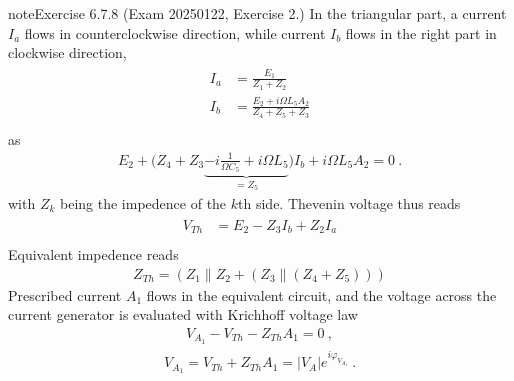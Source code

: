 \documentclass[letterpaper,10pt,english]{jupyterBook}
\begin{document}
\begin{sphinxadmonition}{note}{Exercise 6.7.8 (Exam 2025\sphinxhyphen{}01\sphinxhyphen{}22, Exercise 2.)}
\sphinxAtStartPar
In the triangular part, a current \(I_{a}\) flows in counter\sphinxhyphen{}clockwise direction, while current \(I_b\) flows in the right part in clockwise direction,
\begin{equation*}
\begin{split}\begin{aligned}
  I_a & = \frac{E_1}{Z_1 + Z_2} \\
  I_b & = \frac{E_2 + i \Omega L_5 A_2}{Z_4 + Z_5 + Z_3} \\
\end{aligned}\end{split}
\end{equation*}
\sphinxAtStartPar
as
\begin{equation*}
\begin{split}E_2 + \bigg( Z_4 + Z_3 \underbrace{- i \frac{1}{\Omega C_5} + i \Omega L_5}_{=Z_5} \bigg) I_b + i \Omega L_5 A_2 = 0 \ . \end{split}
\end{equation*}
\sphinxAtStartPar
with \(Z_k\) being the impedence of the \(k\)\sphinxhyphen{}th side. Thevenin voltage thus reads
\begin{equation*}
\begin{split}\begin{aligned}
  V_{Th} & = E_2 - Z_3 I_b + Z_2 I_a \\ 
\end{aligned}\end{split}
\end{equation*}
\sphinxAtStartPar
{} Equivalent impedence reads
\begin{equation*}
\begin{split}Z_{Th} = (Z_1 \parallel Z_2 + ( Z_3 \parallel (Z_4 + Z_5)))\end{split}
\end{equation*}
\sphinxAtStartPar
{} Prescribed current \(A_1\) flows in the equivalent circuit, and the voltage across the current generator is evaluated with Krichhoff voltage law
\begin{equation*}
\begin{split}V_{A_1} - V_{Th} - Z_{Th} A_1 = 0 \ ,\end{split}
\end{equation*}\begin{equation*}
\begin{split}V_{A_1} = V_{Th} + Z_{Th} A_1 = |V_A| e^{i \varphi_{V_{A_1}}} \ .\end{split}

\end{equation*}
\end{sphinxadmonition}
\end{document}
